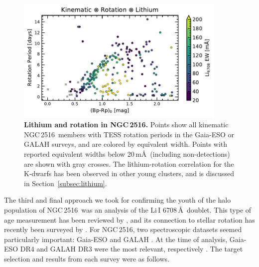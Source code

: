 \documentclass[12pt,twocolumn,tighten]{aastex63}
\newcommand{\cn}{NGC\,2516} %
\begin{document}
\begin{figure}[t]
	\begin{center}
		\leavevmode
		\includegraphics[width=0.9\textwidth]{f5b.pdf}
	\end{center}
	\vspace{-0.7cm}
  \caption{ {\bf Lithium and rotation in NGC\,2516.} Points show all
  kinematic \cn\ members with TESS rotation periods in the Gaia-ESO or
  GALAH surveys, and are colored by equivalent width.  Points with
  reported equivalent widths below 20\,m\AA\ (including
  non-detections) are shown with gray crosses.  The lithium-rotation
  correlation for the K-dwarfs has been observed in other young
  clusters, and is discussed in Section~\ref{subsec:lithium}.
	\label{fig:lithiumrot}
	}
\end{figure}

The third and final approach we took for confirming the youth of the
halo population of \cn\ was an analysis of the Li\,\textsc{I}
6708\,\AA\ doublet.  This type of age measurement has been reviewed by
\citet{soderblom_ages_2010}, and its connection to stellar rotation
has recently been surveyed by \citet{bouvier_lithium-rotation_2020}.
For \cn, two spectroscopic datasets seemed particularly important:
Gaia-ESO \citep{gilmore_gaiaeso_2012} and GALAH
\citep{silva_galah_2015}.  At the time of analysis, Gaia-ESO DR4 and
GALAH DR3 were the most relevant, respectively \citep[{\it
e.g.},][]{randich_gaiaeso_2018,buder_galah_2020}.  The target
selection and results from each survey were as follows.
\end{document}
